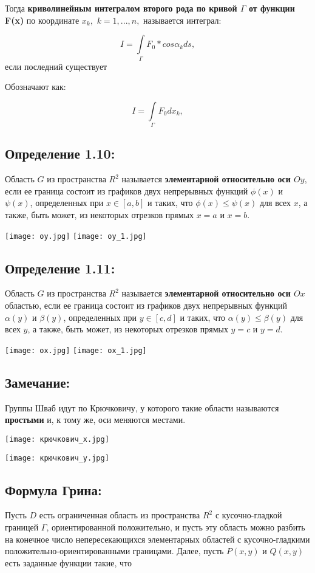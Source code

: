 \documentclass[12pt]{article}
\begin{document}
Тогда \textbf{криволинейным интегралом второго рода по кривой $\Gamma$ от функции F(x)} по координате $x_k,$ $ k = 1,...,n,$ называется интеграл:

	$$I = \int\limits_{\Gamma}{} F_0 * cos \alpha_k d{s},$$
	если последний существует
	
	Обозначают как:
	
		$$I = \int\limits_{\Gamma}{} F_0 d{x_k},$$
	\newpage
\subsection*{Определение 1.10:}
	Область $G$ из пространства $R^2$ называется \textbf{элементарной относительно оси $Oy$}, если ее граница состоит из графиков двух непрерывных функций $\phi(x)$ и $\psi(x)$, определенных при
$x \in [a, b]$ и таких, что $\phi(x)	\leq \psi(x)$ для всех $x$, а также, быть
может, из некоторых отрезков прямых $x = a$ и $x = b$.


\texttt{[image: oy.jpg]}
\texttt{[image: oy\_1.jpg]}

\subsection*{Определение 1.11:}
	Область $G$ из пространства $R^2$ называется \textbf{элементарной относительно оси $Ox$} областью, если ее граница состоит из графиков двух непрерывных функций $\alpha(y)$ и $\beta(y)$, определенных при
$y \in [c, d]$ и таких, что $\alpha(y)	\leq \beta(y)$ для всех $y$, а также, быть
может, из некоторых отрезков прямых $y = c$ и $y = d$.


\texttt{[image: ox.jpg]}
\texttt{[image: ox\_1.jpg]}
\newpage
\subsection*{Замечание:}
	Группы Шваб идут по Крючковичу, у которого такие области называются \textbf{простыми} и, к тому же, оси меняются местами.
	
	
\texttt{[image: крючкович\_x.jpg]}

\texttt{[image: крючкович\_y.jpg]}
\newpage
\subsection*{Формула Грина:}
	Пусть $D$ есть ограниченная область из пространства $R^2$
с кусочно-гладкой границей $\Gamma$, ориентированной положительно, и пусть
эту область можно разбить на конечное число непересекающихся элементарных областей с кусочно-гладкими положительно-ориентированными границами. Далее, пусть $P(x, y)$ и $Q(x, y)$ есть заданные функции
такие, что 
\end{document}
